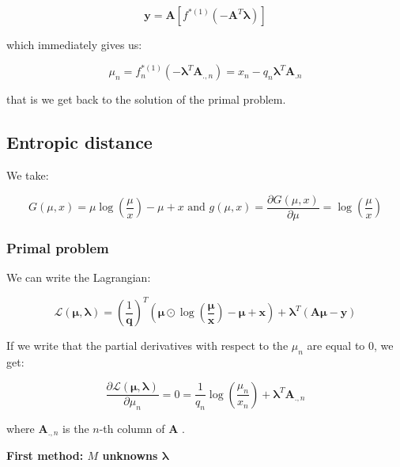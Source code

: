 \documentclass{tex/note}
\begin{document}
\begin{equation*}
\bm{y} = \bm{A} \left[ f^{* \left( 1 \right)} \left( - \bm{A}^T \bm{\lambda} \right) \right]
\end{equation*}

which immediately gives us:

\begin{equation*}
\mu_n = f_n^{* \left( 1 \right)} \left( - \bm{\lambda}^T \bm{A}_{.,n} \right) = x_n - q_n \bm{\lambda}^T \bm{A}_{.n}
\end{equation*}

that is we get back to the solution of the primal problem.

\subsection{Entropic distance}

We take:

\begin{equation*}
G \left( \mu , x \right) = \mu \log \left( \frac{\mu}{x} \right) - \mu + x \text{ and } g \left( \mu , x \right) = \frac{\partial G \left( \mu , x \right)}{\partial \mu} = \log \left( \frac{\mu}{x} \right)
\end{equation*}

\subsubsection{Primal problem}

We can write the Lagrangian:

\begin{equation*}
\mathcal{L} \left( \bm{\mu} , \bm{\lambda} \right) = \left( \frac{1}{\bm{q}} \right)^T \left( \bm{\mu} \odot \log \left( \frac{\bm{\mu}}{\bm{x}} \right) - \bm{\mu} + \bm{x} \right) + \bm{\lambda}^T \left( \bm{A} \bm{\mu} - \bm{y} \right)
\end{equation*}

If we write that the partial derivatives with respect to the $\mu_n$ are equal to $0$, we get:

\begin{equation*}
\frac{\partial \mathcal{L} \left( \bm{\mu} , \bm{\lambda} \right)}{\partial \mu_n} = 0 =
\frac{1}{q_n} \log \left( \frac{\mu_n}{x_n} \right) + \bm{\lambda}^T \bm{A}_{.,n}
\end{equation*}

where $\bm{A}_{.,n}$ is the $n$-th column of $\bm{A}$ .

\textbf{First method: $M$ unknowns $\bm{\lambda}$}
\end{document}
